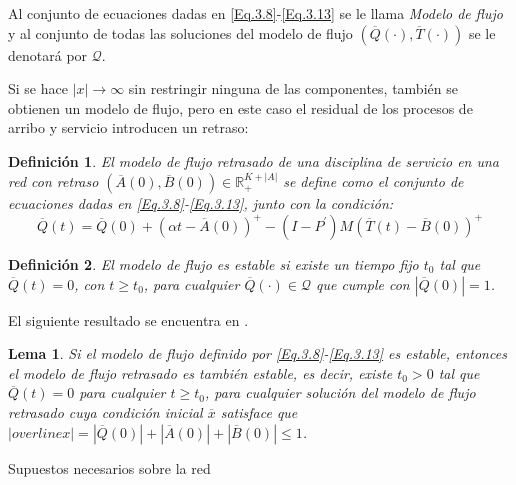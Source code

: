 \documentclass{article}
\newtheorem{Def}{Definición}
\newtheorem{Lemma}{Lema}
\newcommand{\rea}{\mathbb{R}}
\begin{document}
Al conjunto de ecuaciones dadas en \ref{Eq.3.8}-\ref{Eq.3.13} se
le llama {\em Modelo de flujo} y al conjunto de todas las
soluciones del modelo de flujo
$\left(\overline{Q}\left(\cdot\right),\overline{T}
\left(\cdot\right)\right)$ se le denotar\'a por $\mathcal{Q}$.

Si se hace $|x|\rightarrow\infty$ sin restringir ninguna de las
componentes, tambi\'en se obtienen un modelo de flujo, pero en
este caso el residual de los procesos de arribo y servicio
introducen un retraso:

\begin{Def}
El modelo de flujo retrasado de una disciplina de servicio en una
red con retraso
$\left(\overline{A}\left(0\right),\overline{B}\left(0\right)\right)\in\rea_{+}^{K+|A|}$
se define como el conjunto de ecuaciones dadas en
\ref{Eq.3.8}-\ref{Eq.3.13}, junto con la condici\'on:
\begin{equation}\label{CondAd.FluidModel}
\overline{Q}\left(t\right)=\overline{Q}\left(0\right)+\left(\alpha
t-\overline{A}\left(0\right)\right)^{+}-\left(I-P^{'}\right)M\left(\overline{T}\left(t\right)-\overline{B}\left(0\right)\right)^{+}
\end{equation}
\end{Def}

\begin{Def}
El modelo de flujo es estable si existe un tiempo fijo $t_{0}$ tal
que $\overline{Q}\left(t\right)=0$, con $t\geq t_{0}$, para
cualquier $\overline{Q}\left(\cdot\right)\in\mathcal{Q}$ que
cumple con $|\overline{Q}\left(0\right)|=1$.
\end{Def}

El siguiente resultado se encuentra en \cite{Chen}.
\begin{Lemma}
Si el modelo de flujo definido por \ref{Eq.3.8}-\ref{Eq.3.13} es
estable, entonces el modelo de flujo retrasado es tambi\'en
estable, es decir, existe $t_{0}>0$ tal que
$\overline{Q}\left(t\right)=0$ para cualquier $t\geq t_{0}$, para
cualquier soluci\'on del modelo de flujo retrasado cuya
condici\'on inicial $\overline{x}$ satisface que
$|overline{x}|=|\overline{Q}\left(0\right)|+|\overline{A}\left(0\right)|+|\overline{B}\left(0\right)|\leq1$.
\end{Lemma}

Supuestos necesarios sobre la red
\end{document}
